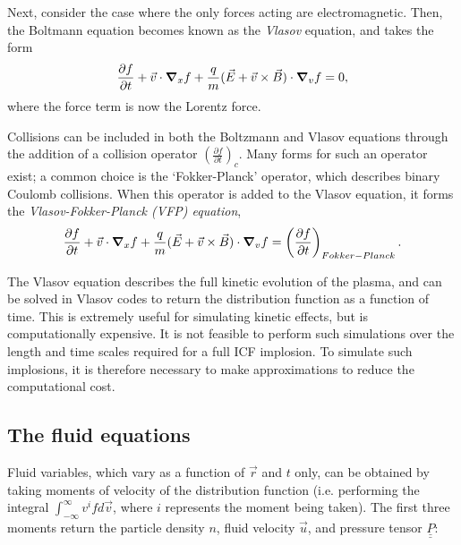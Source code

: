 Next, consider the case where the only forces acting are electromagnetic. Then, the Boltmann equation becomes known as the \textit{Vlasov} equation, and takes the form
\begin{equation} \frac{\partial f}{\partial t} + \vec{v}\cdot \grad_x f + \frac{q}{m}(\vec{E} + \vec{v}\times\vec{B}) \cdot \grad_v f = 0, \end{equation}
where the force term is now the Lorentz force.

Collisions can be included in both the Boltzmann and Vlasov equations through the addition of a collision operator $\left(\frac{\partial f}{\partial t}\right)_c$. Many forms for such an operator exist; a common choice is the `Fokker-Planck' operator, which describes binary Coulomb collisions. When this operator is added to the Vlasov equation, it forms the \textit{Vlasov-Fokker-Planck (VFP) equation},
\begin{equation} \frac{\partial f}{\partial t} + \vec{v}\cdot \grad_x f + \frac{q}{m}(\vec{E} + \vec{v}\times\vec{B}) \cdot \grad_v f = \left(\frac{\partial f}{\partial t}\right)_{Fokker-Planck}. \end{equation}

The Vlasov equation describes the full kinetic evolution of the plasma, and can be solved in Vlasov codes to return the distribution function as a function of time. This is extremely useful for simulating kinetic effects, but is computationally expensive. It is not feasible to perform such simulations over the length and time scales required for a full ICF implosion. To simulate such implosions, it is therefore necessary to make approximations to reduce the computational cost.

\subsection{The fluid equations} \label{FluidDerivation}


Fluid variables, which vary as a function of $\vec{r}$ and $t$ only, can be obtained by taking moments of velocity of the distribution function (i.e. performing the integral $ \int^{\infty}_{-\infty} v^i f d\vec{v} $, where $i$ represents the moment being taken). The first three moments return the particle density $n$, fluid velocity $\vec{u}$, and pressure tensor $\underline{\underline{P}}$:

